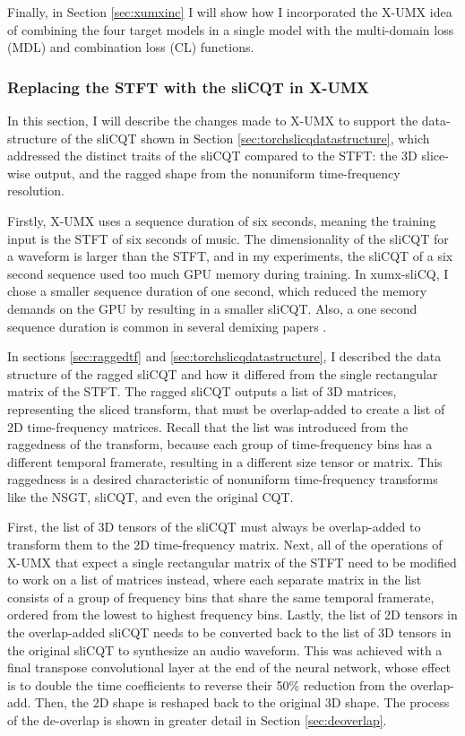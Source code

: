 \documentclass[report.tex]{subfiles}
\begin{document}
Finally, in Section \ref{sec:xumxinc} I will show how I incorporated the X-UMX idea of combining the four target models in a single model with the multi-domain loss (MDL) and combination loss (CL) functions.

\subsubsection{Replacing the STFT with the sliCQT in X-UMX}
\label{sec:replacestft}

In this section, I will describe the changes made to X-UMX to support the data-structure of the sliCQT shown in Section \ref{sec:torchslicqdatastructure}, which addressed the distinct traits of the sliCQT compared to the STFT: the 3D slice-wise output, and the ragged shape from the nonuniform time-frequency resolution.

Firstly, X-UMX uses a sequence duration of six seconds, meaning the training input is the STFT of six seconds of music. The dimensionality of the sliCQT for a waveform is larger than the STFT, and in my experiments, the sliCQT of a six second sequence used too much GPU memory during training. In xumx-sliCQ, I chose a smaller sequence duration of one second, which reduced the memory demands on the GPU by resulting in a smaller sliCQT. Also, a one second sequence duration is common in several demixing papers \parencite{plumbley1, plumbley2, demucs}.

In sections \ref{sec:raggedtf} and \ref{sec:torchslicqdatastructure}, I described the data structure of the ragged sliCQT and how it differed from the single rectangular matrix of the STFT. The ragged sliCQT outputs a list of 3D matrices, representing the sliced transform, that must be overlap-added to create a list of 2D time-frequency matrices. Recall that the list was introduced from the raggedness of the transform, because each group of time-frequency bins has a different temporal framerate, resulting in a different size tensor or matrix. This raggedness is a desired characteristic of nonuniform time-frequency transforms like the NSGT, sliCQT, and even the original CQT.

First, the list of 3D tensors of the sliCQT must always be overlap-added to transform them to the 2D time-frequency matrix. Next, all of the operations of X-UMX that expect a single rectangular matrix of the STFT need to be modified to work on a list of matrices instead, where each separate matrix in the list consists of a group of frequency bins that share the same temporal framerate, ordered from the lowest to highest frequency bins. Lastly, the list of 2D tensors in the overlap-added sliCQT needs to be converted back to the list of 3D tensors in the original sliCQT to synthesize an audio waveform. This was achieved with a final transpose convolutional layer at the end of the neural network, whose effect is to double the time coefficients to reverse their 50\% reduction from the overlap-add. Then, the 2D shape is reshaped back to the original 3D shape. The process of the de-overlap is shown in greater detail in Section \ref{sec:deoverlap}.
\end{document}
